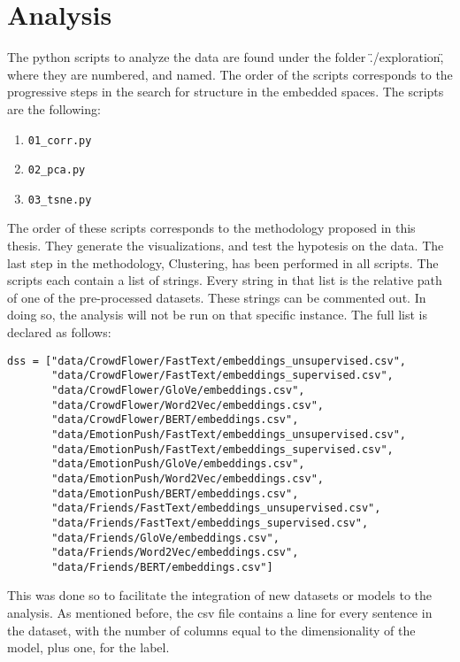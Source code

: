 \section{Analysis}\label{sec:Analysis}
The python scripts to analyze the data are found under the folder \"./exploration\", %
where they are numbered, and named. The order of the scripts corresponds to the progressive steps in the search for structure in the embedded spaces. The scripts are the following:

\begin{enumerate}
  \item \lstinline{01_corr.py}
  \item \lstinline{02_pca.py}
  \item \lstinline{03_tsne.py}
\end{enumerate}

The order of these scripts corresponds to the methodology proposed in this thesis. They generate the visualizations, and test the hypotesis on the data. The last step in the methodology, Clustering, has been performed in all scripts. The scripts each contain a list of strings. Every string in that list is the relative path of one of the pre-processed datasets. These strings can be commented out. In doing so, the analysis will not be run on that specific instance. The full list is declared as follows:

\begin{lstlisting}[caption={Pre-processed datasets},label=lst:datasets,frame=single]
dss = ["data/CrowdFlower/FastText/embeddings_unsupervised.csv",
       "data/CrowdFlower/FastText/embeddings_supervised.csv",
       "data/CrowdFlower/GloVe/embeddings.csv",
       "data/CrowdFlower/Word2Vec/embeddings.csv",
       "data/CrowdFlower/BERT/embeddings.csv",
       "data/EmotionPush/FastText/embeddings_unsupervised.csv",
       "data/EmotionPush/FastText/embeddings_supervised.csv",
       "data/EmotionPush/GloVe/embeddings.csv",
       "data/EmotionPush/Word2Vec/embeddings.csv",
       "data/EmotionPush/BERT/embeddings.csv",
       "data/Friends/FastText/embeddings_unsupervised.csv",
       "data/Friends/FastText/embeddings_supervised.csv",
       "data/Friends/GloVe/embeddings.csv",
       "data/Friends/Word2Vec/embeddings.csv",
       "data/Friends/BERT/embeddings.csv"]
\end{lstlisting}

This was done so to facilitate the integration of new datasets or models to the analysis.
As mentioned before, the csv file contains a line for every sentence in the dataset, with the number of columns equal to the dimensionality of the model, plus one, for the label.

